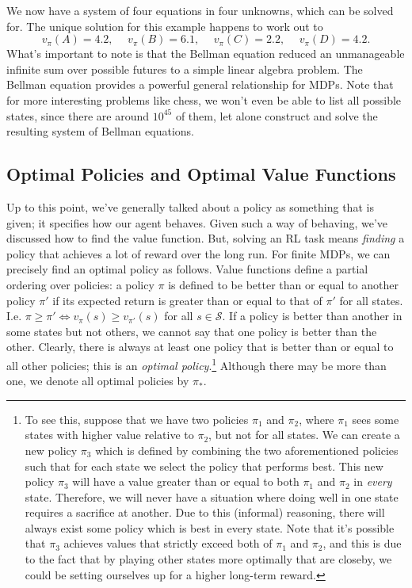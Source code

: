 \documentclass[12pt]{article}
\begin{document}
We now have a system of four equations in four unknowns, which can be solved for. The unique solution for this example happens to work out to
\[
  v_\pi(A) = 4.2, \hspace{15pt} v_\pi(B) = 6.1, \hspace{15pt} v_\pi(C) = 2.2, \hspace{15pt} v_\pi(D) = 4.2.
\]
What's important to note is that the Bellman equation reduced an unmanageable infinite sum over possible futures to a simple linear algebra problem. The Bellman equation provides a powerful general relationship for MDPs.
Note that for more interesting problems like chess, we won't even be able to list all possible states, since there are around $10^{45}$ of them, let alone construct and solve the resulting system of Bellman equations.

\subsection{Optimal Policies and Optimal Value Functions}
Up to this point, we've generally talked about a policy as something that is given; it specifies how our agent behaves. Given such a way of behaving, we've discussed how to find the value function. 
But, solving an RL task means \emph{finding} a policy that achieves a lot of reward over the long run. For finite MDPs, we can precisely find an optimal policy as follows. Value functions define a partial ordering over policies: a policy $\pi$ is defined to be better than or equal to another policy $\pi'$ if its expected return is greater than or equal to that of $\pi'$ for all states. I.e. $\pi \geq \pi' \iff v_\pi(s) \geq v_{\pi'}(s)$ for all $s \in \mathcal S$.
If a policy is better than another in some states but not others, we cannot say that one policy is better than the other. Clearly, there is always at least one policy that is better than or equal to all other policies; this is an \emph{optimal policy}.\footnote{To see this, suppose that we have two policies $\pi_1$ and $\pi_2$, where $\pi_1$ sees some states with higher value relative to $\pi_2$, but not for all states. We can create a new policy $\pi_3$ which is defined by combining the two aforementioned policies such that for each state we select the policy that performs best. This new policy $\pi_3$ will have a value greater than or equal to both $\pi_1$ and $\pi_2$ in \emph{every} state. Therefore, we will never have a situation where doing well in one state requires a sacrifice at another. Due to this (informal) reasoning, there will always exist some policy which is best in every state. Note that it's possible that $\pi_3$ achieves values that strictly exceed both of $\pi_1$ and $\pi_2$, and this is due to the fact that by playing other states more optimally that are closeby, we could be setting ourselves up for a higher long-term reward.} Although there may be more than one, we denote all optimal policies by $\pi_*$.
\end{document}
